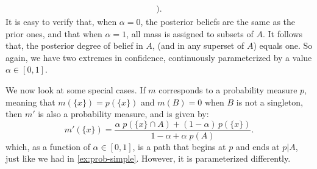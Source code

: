 \begin{example}
\begin{align*}
		\Big).
\end{align*}
It is easy to verify that, when $\alpha = 0$, the posterior beliefs are the same as the
prior ones, and that when $\alpha = 1$,
all mass is assigned to subsets of $A$.
It follows that, the posterior degree of belief 
in $A$, (and in any superset of $A$) equals one.
So again, we have two extremes in confidence, continuously parameterized
by a value $\alpha \in [0,1]$.

We now look at some special cases. If $m$ corresponds to a probability
measure $p$, meaning that $m(\{x\}) = p(\{x\})$ and $m(B) = 0$ when $B$ is not a singleton, then
$m'$ is also a probability measure, and is given by:
\begin{equation}
m'(\{x\}) =
 \frac{\alpha\; p(\{x\} \cap A) + (1-\alpha)\, p(\{x\})}{1 - \alpha + \alpha\; p(A)}.
\end{equation}
which, as a function of $\alpha \in [0,1]$, is a path that begins at $p$
and ends at $p|A$, just like we had in \cref{ex:prob-simple}. However,
it is parameterized differently.
%


\end{example}
